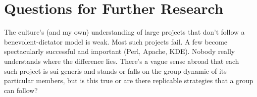 \section{Questions for Further Research}

The culture's (and my own) understanding of large projects that don't follow a
benevolent-dictator model is weak.  Most such projects fail.  A few become
spectacularly successful and important (Perl, Apache, KDE).  Nobody really
understands where the difference lies.  There's a vague sense abroad that each
such project is sui generis and stands or falls on the group dynamic of its
particular members, but is this true or are there replicable strategies that a
group can follow?

